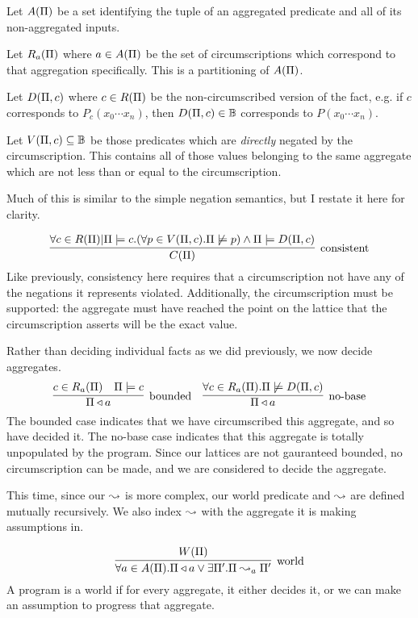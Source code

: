 Let $A(\Pi)$ be a set identifying the tuple of an aggregated predicate and all of its non-aggregated inputs.

Let $R_a(\Pi)$ where $a \in A(\Pi)$ be the set of circumscriptions which correspond to that aggregation specifically.
This is a partitioning of $A(\Pi)$.

Let $D(\Pi, c)$ where $c \in R(\Pi)$ be the non-circumscribed version of the fact, e.g. if $c$ corresponds to $P_c(x_0 \cdots x_n)$, then $D(\Pi, c) \in \mathbb{B}$ corresponds to $P(x_0 \cdots x_n)$.

Let $V(\Pi, c) \subseteq \mathbb{B}$ be those predicates which are \emph{directly} negated by the circumscription.
This contains all of those values belonging to the same aggregate which are not less than or equal to the circumscription.


Much of this is similar to the simple negation semantics, but I restate it here for clarity.

\[
	\infer[\textrm{consistent}]{\cons{\Pi}}{\forall c \in \circset(\Pi) | \Pi \models c. (\forall p \in \viol{\Pi}{c}. \Pi \not \models p) \wedge \Pi \models \decirc{\Pi}{c}}
\]
Like previously, consistency here requires that a circumscription not have any of the negations it represents violated.
Additionally, the circumscription must be supported: the aggregate must have reached the point on the lattice that the circumscription asserts will be the exact value.

Rather than deciding individual facts as we did previously, we now decide aggregates.
\[
	\infer[\textrm{bounded}]{\Pi \decides a}{c \in \circset_a(\Pi) & \Pi \models c}
	\quad
	\infer[\textrm{no-base}]{\Pi \decides a}{\forall c \in \circset_a(\Pi). \Pi \not \models \decirc{\Pi}{c}}
\]
The bounded case indicates that we have circumscribed this aggregate, and so have decided it.
The no-base case indicates that this aggregate is totally unpopulated by the program.
Since our lattices are not gauranteed bounded, no circumscription can be made, and we are considered to decide the aggregate.

This time, since our $\leadsto$ is more complex, our world predicate and $\leadsto$ are defined mutually recursively.
We also index $\leadsto$ with the aggregate it is making assumptions in.

\[
	\infer[\textrm{world}]{\forall a \in \aggset(\Pi). \Pi \decides a \vee \exists \Pi'. \Pi \stepass_a \Pi'}{\world{\Pi}}
\]
A program is a world if for every aggregate, it either decides it, or we can make an assumption to progress that aggregate.

